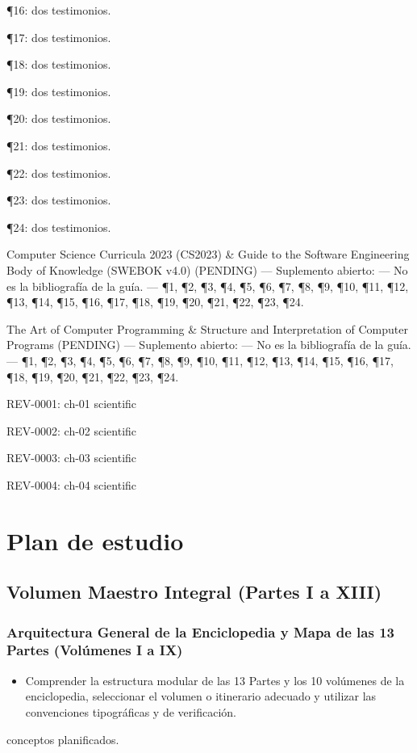 \documentclass{book}
\begin{document}
\noindent ¶16: dos testimonios.

\noindent ¶17: dos testimonios.

\noindent ¶18: dos testimonios.

\noindent ¶19: dos testimonios.

\noindent ¶20: dos testimonios.

\noindent ¶21: dos testimonios.

\noindent ¶22: dos testimonios.

\noindent ¶23: dos testimonios.

\noindent ¶24: dos testimonios.

\medskip

\noindent Computer Science Curricula 2023 (CS2023) \& Guide to the Software Engineering Body of Knowledge (SWEBOK v4.0) (PENDING) --- Suplemento abierto: --- No es la bibliografía de la guía. --- \P1, \P2, \P3, \P4, \P5, \P6, \P7, \P8, \P9, \P10, \P11, \P12, \P13, \P14, \P15, \P16, \P17, \P18, \P19, \P20, \P21, \P22, \P23, \P24.

\noindent The Art of Computer Programming \& Structure and Interpretation of Computer Programs (PENDING) --- Suplemento abierto: --- No es la bibliografía de la guía. --- \P1, \P2, \P3, \P4, \P5, \P6, \P7, \P8, \P9, \P10, \P11, \P12, \P13, \P14, \P15, \P16, \P17, \P18, \P19, \P20, \P21, \P22, \P23, \P24.

\noindent REV-0001: ch-01 scientific

\noindent REV-0002: ch-02 scientific

\noindent REV-0003: ch-03 scientific

\noindent REV-0004: ch-04 scientific
\chapter{Plan de estudio}

\section*{Volumen Maestro Integral (Partes I a XIII)}

\subsection*{\checkmark Arquitectura General de la Enciclopedia y Mapa de las 13 Partes (Volúmenes I a IX)}
\begin{itemize}
\item Comprender la estructura modular de las 13 Partes y los 10 volúmenes de la enciclopedia, seleccionar el volumen o itinerario adecuado y utilizar las convenciones tipográficas y de verificación.
\end{itemize}
 conceptos planificados.
\end{document}
